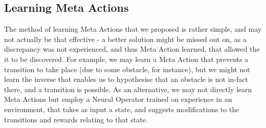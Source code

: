 \subsection{Learning Meta Actions}
The method of learning Meta Actions that we proposed is rather simple, and may not actually be that effective - a better solution might be missed out on, as a discrepancy was not experienced, and thus Meta Action learned, that allowed the it to be discovered. For example, we may learn a Meta Action that prevents a transition to take place (due to some obstacle, for instance), but we might not learn the inverse that enables us to hypothesise that an obstacle is not in-fact there, and a transition is possible. As an alternative, we may not directly learn Meta Actions but employ a Neural Operator trained on experience in an environment, that takes as input a state, and suggests modifications to the transitions and rewards relating to that state.


